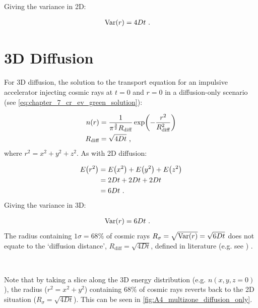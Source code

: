 \noindent Giving the variance in 2D:

\begin{equation}
    \begin{aligned}
        \mathrm{Var}\qty(r)&=4Dt\text{ .} 
    \end{aligned}
\end{equation}

\section{3D Diffusion}

For 3D diffusion, the solution to the transport equation for an impulsive accelerator injecting cosmic rays at $t=0$ and $r=0$ in a diffusion-only scenario (see \autoref{eq:chapter_7_cr_ev_green_solution}):

\begin{equation}
    \begin{aligned}
        n\qty(r)&=\frac{1}{\pi^{\frac{3}{2}} R_\text{diff}}\exp(-\frac{r^2}{R_\text{diff}^2}) \\
        R_\text{diff}&=\sqrt{4Dt}\text{ ,} 
    \end{aligned}
\end{equation}
\noindent where $r^2=x^2+y^2+z^2$. As with 2D diffusion:

\begin{equation}
    \begin{aligned}
        E\qty(r^2)&=E\qty(x^2)+E\qty(y^2)+E\qty(z^2) \\
        &= 2Dt + 2Dt + 2Dt \\
        &=6Dt\text{ .} 
    \end{aligned}
\end{equation}
\noindent Giving the variance in 3D:

\begin{equation}
    \begin{aligned}
        \mathrm{Var}\qty(r)&=6Dt\text{ .} 
    \end{aligned}
\end{equation}
\noindent The radius containing $1\sigma=68\%$ of cosmic rays $R_{\sigma}=\sqrt{\mathrm{Var}\qty(r)}=\sqrt{6Dt}$ does not equate to the `diffusion distance', $R_\text{diff}=\sqrt{4Dt}$, defined in literature (e.g. see \cite{1995PhRvD..52.3265A}) .
\par~\par 
Note that by taking a slice along the 3D energy distribution (e.g. $n(x,y,z=0)$), the radius ($r^2=x^2+y^2$) containing $68\%$ of cosmic rays reverts back to the 2D situation ($R_\sigma=\sqrt{4Dt}$). This can be seen in \autoref{fig:A4_multizone_diffusion_only}.

